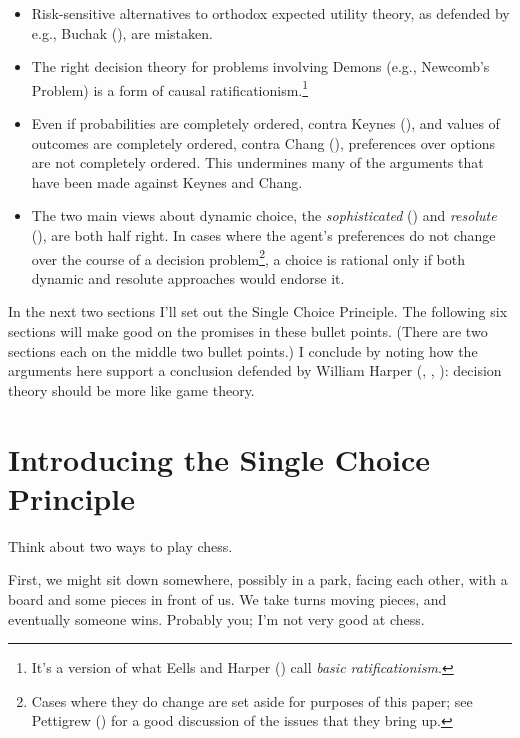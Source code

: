 \documentclass[
  10pt,
  letterpaper,
  DIV=11,
  numbers=noendperiod,
  twoside]{scrartcl}
\providecommand{\tightlist}{%
  \setlength{\itemsep}{0pt}\setlength{\parskip}{0pt}}\usepackage{longtable,booktabs,array}
\begin{document}
\begin{itemize}
\tightlist
\item
  Risk-sensitive alternatives to orthodox expected utility theory, as
  defended by e.g., Buchak (), are
  mistaken.
\item
  The right decision theory for problems involving Demons (e.g.,
  Newcomb's Problem) is a form of causal ratificationism.\footnote{It's
    a version of what Eells and Harper
    () call \emph{basic
    ratificationism}.}
\item
  Even if probabilities are completely ordered, contra Keynes
  (), and values of outcomes are
  completely ordered, contra Chang (),
  preferences over options are not completely ordered. This undermines
  many of the arguments that have been made against Keynes and Chang.
\item
  The two main views about dynamic choice, the \emph{sophisticated}
  () and \emph{resolute}
  (), are both half right.
  In cases where the agent's preferences do not change over the course
  of a decision problem\footnote{Cases where they do change are set
    aside for purposes of this paper; see Pettigrew
    () for a good discussion of the
    issues that they bring up.}, a choice is rational only if both
  dynamic and resolute approaches would endorse it.
\end{itemize}

In the next two sections I'll set out the Single Choice Principle. The
following six sections will make good on the promises in these bullet
points. (There are two sections each on the middle two bullet points.) I
conclude by noting how the arguments here support a conclusion defended
by William Harper (,
, ):
decision theory should be more like game theory.

\section{Introducing the Single Choice Principle}\label{sec-scp-intro}

Think about two ways to play chess.

First, we might sit down somewhere, possibly in a park, facing each
other, with a board and some pieces in front of us. We take turns moving
pieces, and eventually someone wins. Probably you; I'm not very good at
chess.
\end{document}
